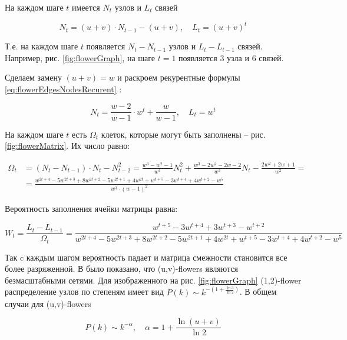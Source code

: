 \documentclass[10pt,aps,pra]{revtex4-1}
\begin{document}
На каждом шаге $t$ имеется $N_t$ узлов и $L_t$ связей \cite{Rozenfeld1}

\begin{equation}
\label{eq:flowerEdgesNodesRecurent}
N_t = (u+v) \cdot N_{t-1}-(u+v), \quad L_t=(u+v)^t
\end{equation}

Т.е. на каждом шаге $t$ появляется $N_t-N_{t-1}$ узлов и $L_t-L_{t-1}$ связей. Например, рис. \ref{fig:flowerGraph}, на шаге $t=1$ появляется 3 узла и 6 связей.

Сделаем замену $(u+v)=w$ и раскроем рекурентные формулы \ref{eq:flowerEdgesNodesRecurent} \cite{Rozenfeld1}:

\begin{equation}
\label{eq:flowerEdgesNodesOpenRecurent}
N_t = \frac{w-2}{w-1} \cdot w^t+\frac{w}{w-1}, \quad L_t=w^t
\end{equation}

На каждом шаге $t$ есть $\Omega_t$ клеток, которые могут быть заполнены – рис. \ref{fig:flowerMatrix}. Их число равно:

\begin{equation}
\label{eq:flowerEmpty}
\begin{split}
\Omega_{t} &=(N_t-N_{t-1}) \cdot N_t-N_{t-2}^2 = \frac{w^3-w^2-1}{w^4}N_t^2 + \frac{w^3-2w^2-2w-2}{w^3}N_t-\frac{2w^2+2w+1}{w^2} = \\
           &= \frac{w^{2t+4}-5w^{2t+3}+8w^{2t+2}-5w^{2t+1}+4w^{2t}+w^{t+5}-3w^{t+4}+4w^{t+2}-w^5}{w^{3} \cdot (w-1)^2}
\end{split}
\end{equation}

Вероятность заполнения ячейки матрицы равна:

\begin{equation}
W_t=\frac{L_t-L_{t-1}}{\Omega_t}=\frac{w^{t+5}-3w^{t+4}+3w^{t+3}-w^{t+2}}{w^{2t+4}-5w^{2t+3}+8w^{2t+2}-5w^{2t+1}+4w^{2t}+w^{t+5}-3w^{t+4}+4w^{t+2}-w^5}
\end{equation}

Так c каждым шагом вероятность падает и матрица смежности становится все более разряженной.
В \cite{Dor1} было показано, что (u,v)-flowers являются безмасштабными сетями. Для изображенного на рис. \ref{fig:flowerGraph} (1,2)-flower распределение узлов по степеням имеет вид $P(k) \sim k^{-(1+\frac{\ln{3}}{\ln{2}})}$. В общем случаи для (u,v)-flowers \cite{Rozenfeld1}

\begin{equation}
P(k) \sim k^{-\alpha}, \quad \alpha = 1+\frac{\ln{(u+v)}}{\ln{2}}
\end{equation}
\end{document}
